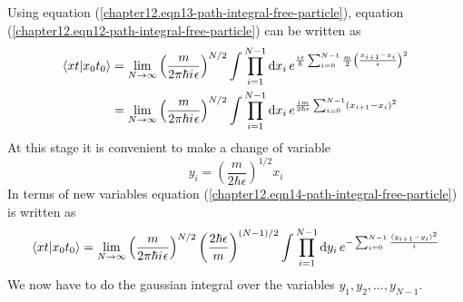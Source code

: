	Using equation (\ref{chapter12.eqn13-path-integral-free-particle}), equation (\ref{chapter12.eqn12-path-integral-free-particle}) can be written as
	\begin{align}
		\braket{x t}{x_0 t_0} 
		&= \lim\limits_{N \rightarrow \infty} \left(\frac{m}{2\pi \hbar {i\mkern1mu} \epsilon}\right)^{N/2} \int \prod_{i=1}^{N-1} \dd{x_i} e^{\frac{{i\mkern1mu} \epsilon}{\hbar} \sum_{i=0}^{N-1} \frac{m}{2} \left(\frac{x_{i+1} - x_i}{\epsilon}\right)^2} \\
		&= \lim\limits_{N \rightarrow \infty} \left(\frac{m}{2\pi \hbar {i\mkern1mu} \epsilon}\right)^{N/2} \int \prod_{i=1}^{N-1} \dd{x_i} e^{\frac{{i\mkern1mu} m}{2\hbar \epsilon} \sum_{i=0}^{N-1} (x_{i+1} - x_i)^2}
		\label{chapter12.eqn14-path-integral-free-particle}
	\end{align}
	At this stage it is convenient to make a change of variable
	\begin{equation}
		y_i = \left(\frac{m}{2\hbar \epsilon}\right)^{1/2} x_i
	\end{equation}
	In terms of new variables equation (\ref{chapter12.eqn14-path-integral-free-particle}) is written as
	\begin{equation}
		\braket{x t}{x_0 t_0} 
		= \lim\limits_{N \rightarrow \infty} \left(\frac{m}{2\pi \hbar {i\mkern1mu} \epsilon}\right)^{N/2} \left(\frac{2\hbar \epsilon}{m}\right)^{(N-1)/2} \int \prod_{i=1}^{N-1} \dd{y_i} e^{-\sum_{i=0}^{N-1} \frac{(y_{i+1} - y_i)^2}{i}}
		\label{chapter12.eqn15-path-integral-free-particle}
	\end{equation}
	We now have to do the gaussian integral over the variables $y_1, y_2, \ldots, y_{N-1}$.
	
